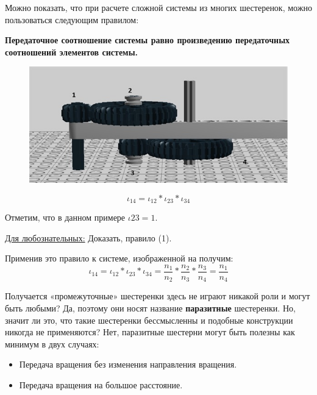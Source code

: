 Можно показать, что при расчете сложной системы из многих шестеренок, можно пользоваться следующим правилом:

{\bfseries Передаточное соотношение системы равно произведению передаточных соотношений элементов системы.}
\clearpage
\begin{figure}[h!]
	\begin{center}
		\includegraphics[width=1\linewidth]{chapters/chapter6/images/4}
		\caption{}
		\label{ris:image6x4}
	\end{center}
\end{figure}

\begin{equation}
\iota_{14}=\iota_{12}*\iota_{23}*\iota_{34}
\end{equation}

Отметим, что в данном примере \(\iota{23}=1\).

\underline{Для любознательных:} Доказать, правило (1). 

Применив это правило к системе, изображенной на  получим:
\begin{equation}
\iota_{14}=\iota_{12}*\iota_{23}*\iota_{34}=\frac{n_1}{n_2}*\frac{n_2}{n_3}*\frac{n_3}{n_4}=\frac{n_1}{n_4}
\end{equation}

Получается «промежуточные» шестеренки здесь не играют никакой роли и могут быть любыми? Да, поэтому они носят название {\bfseries паразитные} шестеренки. Но, значит ли это, что такие шестеренки бессмысленны и подобные конструкции никогда не применяются? Нет, паразитные шестерни могут быть полезны как минимум в двух случаях:
\begin{itemize}
	\renewcommand{\textbullet}{\textendash}
	\item Передача вращения без изменения направления вращения. 
	\item Передача вращения на большое расстояние.\\\\
\end{itemize}

